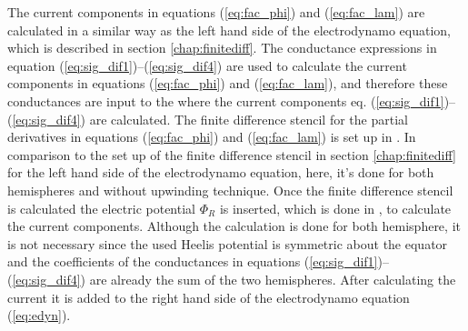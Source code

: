 The current components in equations (\ref{eq:fac_phi}) and (\ref{eq:fac_lam})
are calculated in a similar way as the left hand side of the electrodynamo 
equation, which is described in section
\ref{chap:finitediff}. The conductance expressions in equation 
(\ref{eq:sig_dif1})--(\ref{eq:sig_dif4}) are used to calculate the current 
components in equations (\ref{eq:fac_phi}) and (\ref{eq:fac_lam}), and therefore
these conductances are input to the 
 where the current components eq. 
(\ref{eq:sig_dif1})--(\ref{eq:sig_dif4}) are calculated. 
The finite difference stencil for the partial derivatives in equations 
(\ref{eq:fac_phi}) and (\ref{eq:fac_lam})  is set up in  
. In comparison to the set up of the finite difference 
stencil in section
\ref{chap:finitediff} for the left hand side of the electrodynamo equation, 
here, it's done for both hemispheres and 
without upwinding technique. Once the finite difference stencil is calculated 
the electric
potential $\Phi_R$ is inserted, which is done in , 
to calculate the
current components. Although the calculation is done for both hemisphere, 
it is not necessary since the used Heelis potential
is symmetric about the equator and the coefficients of the conductances in equations 
(\ref{eq:sig_dif1})--(\ref{eq:sig_dif4}) are already the sum of the two
hemispheres. After calculating the current it is added to the right hand side of the
electrodynamo equation (\ref{eq:edyn}).
%
